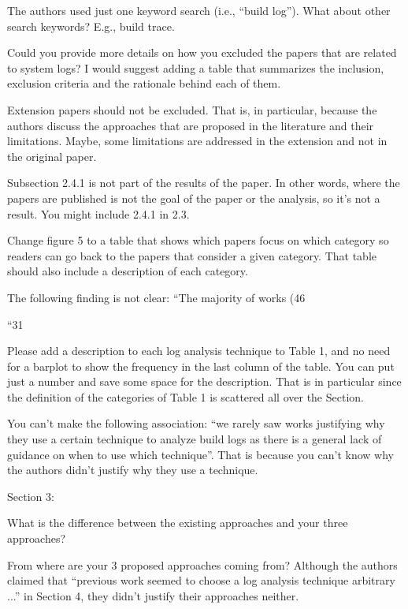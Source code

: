 \documentclass[10pt,a4wide]{article}
\renewenvironment{leftbar}{%
	\vspace{0.1cm}
	\def\FrameCommand{\vrule width 0.4pt \hspace{15pt}}%
	\MakeFramed {\advance\hsize-\width \FrameRestore}}%
{\endMakeFramed\vspace{0.1cm}}
\begin{document}
\begin{leftbar}
The authors used just one keyword search (i.e., “build log”). What about other search keywords? E.g., build trace.

Could you provide more details on how you excluded the papers that are related to system logs? I would suggest adding a table that summarizes the inclusion, exclusion criteria and the rationale behind each of them.

Extension papers should not be excluded. That is, in particular, because the authors discuss the approaches that are proposed in the literature and their limitations. Maybe, some limitations are addressed in the extension and not in the original paper.

Subsection 2.4.1 is not part of the results of the paper. In other words, where the papers are published is not the goal of the paper or the analysis, so it’s not a result. You might include 2.4.1 in 2.3.

Change figure 5 to a table that shows which papers focus on which category so readers can go back to the papers that consider a given category. That table should also include a description of each category.

The following finding is not clear: “The majority of works (46%

“31%

Please add a description to each log analysis technique to Table 1, and no need for a barplot to show the frequency in the last column of the table. You can put just a number and save some space for the description. That is in particular since the definition of the categories of Table 1 is scattered all over the Section.

You can’t make the following association: “we rarely saw works justifying why they use a certain technique to analyze build logs as there is a general lack of guidance on when to use which technique”. That is because you can’t know why the authors didn’t justify why they use a technique.

Section 3:

What is the difference between the existing approaches and your three approaches?

From where are your 3 proposed approaches coming from? Although the authors claimed that “previous work seemed to choose a log analysis technique arbitrary ...” in Section 4, they didn’t justify their approaches neither.


\end{leftbar}
\end{document}
